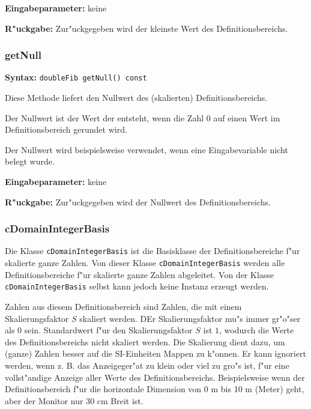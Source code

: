 \bigskip\noindent
\textbf{Eingabeparameter:} keine

\bigskip\noindent
\textbf{R"uckgabe:} Zur"uckgegeben wird der kleinste Wert des Definitionsbereichs.


\subsubsection{getNull}

\textbf{Syntax:} \verb|doubleFib getNull() const|

\bigskip\noindent
Diese Methode liefert den Nullwert des (skalierten) Definitionsbereichs.

Der Nullwert ist der Wert der entsteht, wenn die Zahl $0$ auf einen Wert im Definitionsbereich gerundet wird.

Der Nullwert wird beispielsweise verwendet, wenn eine Eingabevariable nicht belegt wurde.

\bigskip\noindent
\textbf{Eingabeparameter:} keine

\bigskip\noindent
\textbf{R"uckgabe:} Zur"uckgegeben wird der Nullwert des Definitionsbereichs.



\subsubsection{cDomainIntegerBasis}

Die Klasse \verb|cDomainIntegerBasis| ist die Basisklasse der Definitionsbereiche f"ur skalierte ganze Zahlen. Von dieser Klasse \verb|cDomainIntegerBasis| werden alle Definitionsbereiche f"ur skalierte ganze Zahlen abgeleitet. Von der Klasse \verb|cDomainIntegerBasis| selbst kann jedoch keine Instanz erzeugt werden.

Zahlen aus diesem Definitionsbereich sind Zahlen, die mit einem Skalierungsfaktor $S$ skaliert werden. DEr Skalierungsfaktor mu"s immer gr"o"ser als $0$ sein. Standardwert f"ur den Skalierungsfaktor $S$ ist $1$, wodurch die Werte des Definitionsbereichs nicht skaliert werden. Die Skalierung dient dazu, um (ganze) Zahlen besser auf die SI-Einheiten Mappen zu k"onnen. Er kann ignoriert werden, wenn z. B. das Anzeigeger"at zu klein oder viel zu gro"s ist, f"ur eine vollst"andige Anzeige aller Werte des Definitionsbereichs. Beispielsweise wenn der Definitionsbereich f"ur die horizontale Dimension von 0 m bis 10 m (Meter) geht, aber der Monitor nur 30 cm Breit ist.

